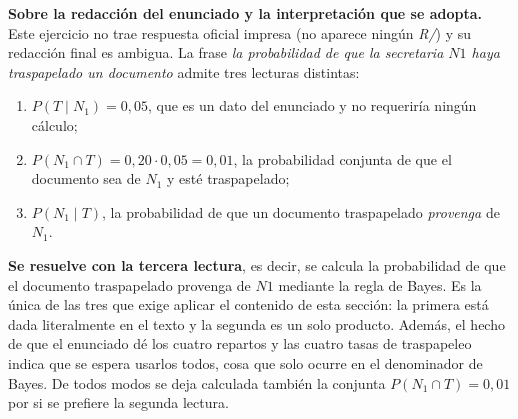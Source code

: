 \documentclass[11pt]{article}
\begin{document}
\begin{nota}
\textbf{Sobre la redacción del enunciado y la interpretación que se adopta.} Este ejercicio no trae respuesta oficial impresa (no aparece ningún \emph{R/}) y su redacción final es ambigua. La frase \emph{la probabilidad de que la secretaria $N1$ haya traspapelado un documento} admite tres lecturas distintas:
\begin{enumerate}[leftmargin=*,nosep]
  \item $P(T\mid N_1)=0,05$, que es un dato del enunciado y no requeriría ningún cálculo;
  \item $P(N_1\cap T)=0,20\cdot 0,05=0,01$, la probabilidad conjunta de que el documento sea de $N_1$ y esté traspapelado;
  \item $P(N_1\mid T)$, la probabilidad de que un documento traspapelado \emph{provenga} de $N_1$.
\end{enumerate}
\textbf{Se resuelve con la tercera lectura}, es decir, se calcula la probabilidad de que el documento traspapelado provenga de $N1$ mediante la regla de Bayes. Es la única de las tres que exige aplicar el contenido de esta sección: la primera está dada literalmente en el texto y la segunda es un solo producto. Además, el hecho de que el enunciado dé los cuatro repartos y las cuatro tasas de traspapeleo indica que se espera usarlos todos, cosa que solo ocurre en el denominador de Bayes. De todos modos se deja calculada también la conjunta $P(N_1\cap T)=0,01$ por si se prefiere la segunda lectura.
\end{nota}
\end{document}
